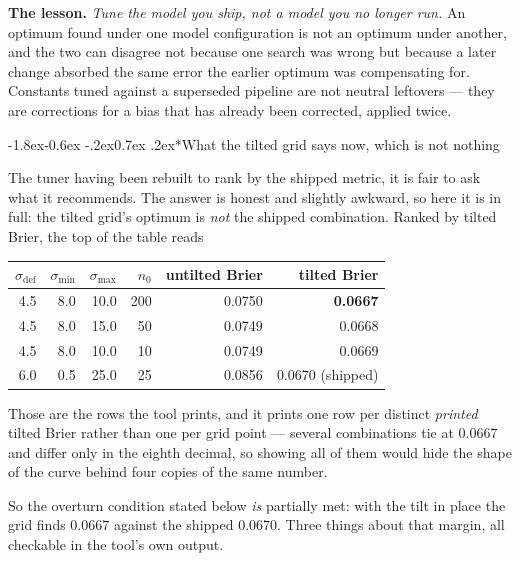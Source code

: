 \documentclass[10pt,a4paper]{article}
\makeatletter
\theoremstyle{plain}
\theoremstyle{definition}
\theoremstyle{remark}
\renewcommand\subsubsection{\@startsection{subsubsection}{3}{\z@}%
  {-1.8ex\@plus -0.6ex \@minus -.2ex}{0.7ex \@plus .2ex}{\normalfont\normalsize\bfseries}}
\makeatother
\begin{document}
\textbf{The lesson.} \emph{Tune the model you ship, not a model you no longer run.} An
optimum found under one model configuration is not an optimum under another, and the two
can disagree not because one search was wrong but because a later change absorbed the
same error the earlier optimum was compensating for. Constants tuned against a
superseded pipeline are not neutral leftovers --- they are corrections for a bias that
has already been corrected, applied twice.

\subsubsection*{What the tilted grid says now, which is not nothing}

The tuner having been rebuilt to rank by the shipped metric, it is fair to ask what it
recommends. The answer is honest and slightly awkward, so here it is in full: the tilted
grid's optimum is \emph{not} the shipped combination. Ranked by tilted Brier, the top of
the table reads

\begin{center}
\small
\begin{tabular}{rrrrrr}
\toprule
$\sigma_{\text{def}}$ & $\sigma_{\min}$ & $\sigma_{\max}$ & $n_0$ & untilted Brier & tilted Brier \\
\midrule
4.5 & 8.0 & 10.0 & 200 & 0.0750 & \textbf{0.0667} \\
4.5 & 8.0 & 15.0 & 50  & 0.0749 & 0.0668 \\
4.5 & 8.0 & 10.0 & 10  & 0.0749 & 0.0669 \\
\midrule
6.0 & 0.5 & 25.0 & 25  & 0.0856 & 0.0670 \quad (shipped) \\
\bottomrule
\end{tabular}
\end{center}

\noindent
Those are the rows the tool prints, and it prints one row per distinct \emph{printed}
tilted Brier rather than one per grid point --- several combinations tie at $0.0667$ and
differ only in the eighth decimal, so showing all of them would hide the shape of the
curve behind four copies of the same number.

So the overturn condition stated below \emph{is} partially met: with the tilt in place the
grid finds $0.0667$ against the shipped $0.0670$. Three things about that margin, all
checkable in the tool's own output.
\end{document}
